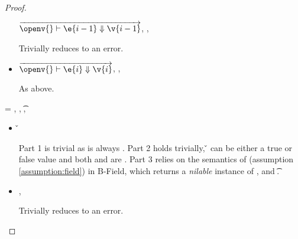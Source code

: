 \begin{lemma}
\begin{proof}
\begin{case}[T-NewStatic]
\begin{itemize}
\begin{subcase}[BE-New1] $\overrightarrow{
  \opsem {\openv{}}
         {\e{i-1}}
         {\v{i-1}}
       }$,
  \opsem {\openv{}}
         {}
         {\errorvalv{}},
  \opsem {\openv{}} {\e{}} {\errorvalv{}}

        Trivially reduces to an error.

\end{subcase}
  \item[]

\begin{subcase}[BE-New2] 
  $\overrightarrow{
  \opsem {\openv{}}
         {\e{i}}
         {\v{i}}
       }$,
                  {}
                  {}
                  {\errorvalv{}},
        \opsem {\openv{}} {\e{}} {\errorvalv{}}

        As above.

\end{subcase}
\end{itemize}
\end{case}

\begin{case}[T-FieldStatic]
  \e{} = { {} {\fld{}} {}},
   {\class{}},
   {\t{}},
  \judgementtwo {\propenv{}} { {\class{}}}

\begin{itemize}
  \item[]
\begin{subcase}[B-Field]
  \opsem {\openv{}}
         {} 
         { {\classfieldpair{\fld{}} {\v{}}}}


Part 1 is trivial as \object{} is always \emptyobject{}.
Part 2 holds trivially, \v{} can be either a true or false value
and both {\thenprop{\prop{}}} and {\elseprop{\prop{}}}
are \topprop{}.
Part 3 relies on the semantics of \getfieldliteral (assumption \ref{assumption:field})
in B-Field, which returns a \emph{nilable} instance of ,
and  {\t{}}.
\end{subcase}
  \item[]
\begin{subcase}[BE-Field]
  \opsem {\openv{}}
         {} 
         {\errorvalv{}},
  \opsem {\openv{}}
         {\e{}}
         {\errorvalv{}}

         Trivially reduces to an error.


\end{subcase}
\end{itemize}
\end{case}
\end{proof}
\end{lemma}

